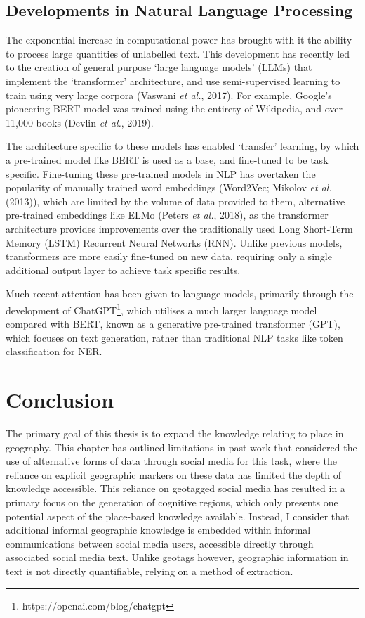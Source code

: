 \documentclass[
  letterpaper,
  11pt,
  english,
  onehalfspacing,
  headsepline]{MastersDoctoralThesis}
\begin{document}
\hypertarget{developments-in-natural-language-processing}{%
\subsection{Developments in Natural Language
Processing}\label{developments-in-natural-language-processing}}

The exponential increase in computational power has brought with it the
ability to process large quantities of unlabelled text. This development
has recently led to the creation of general purpose `large language
models' (LLMs) that implement the `transformer' architecture, and use
semi-supervised learning to train using very large corpora (Vaswani
\emph{et al.}, 2017). For example, Google's pioneering BERT model was
trained using the entirety of Wikipedia, and over 11,000 books (Devlin
\emph{et al.}, 2019).

The architecture specific to these models has enabled `transfer'
learning, by which a pre-trained model like BERT is used as a base, and
fine-tuned to be task specific. Fine-tuning these pre-trained models in
NLP has overtaken the popularity of manually trained word embeddings
(Word2Vec; Mikolov \emph{et al.} (2013)), which are limited by the
volume of data provided to them, alternative pre-trained embeddings like
ELMo (Peters \emph{et al.}, 2018), as the transformer architecture
provides improvements over the traditionally used Long Short-Term Memory
(LSTM) Recurrent Neural Networks (RNN). Unlike previous models,
transformers are more easily fine-tuned on new data, requiring only a
single additional output layer to achieve task specific results.

Much recent attention has been given to language models, primarily
through the development of ChatGPT\footnote{https://openai.com/blog/chatgpt},
which utilises a much larger language model compared with BERT, known as
a generative pre-trained transformer (GPT), which focuses on text
generation, rather than traditional NLP tasks like token classification
for NER.

\hypertarget{sec-litcon}{%
\section{Conclusion}\label{sec-litcon}}

The primary goal of this thesis is to expand the knowledge relating to
place in geography. This chapter has outlined limitations in past work
that considered the use of alternative forms of data through social
media for this task, where the reliance on explicit geographic markers
on these data has limited the depth of knowledge accessible. This
reliance on geotagged social media has resulted in a primary focus on
the generation of cognitive regions, which only presents one potential
aspect of the place-based knowledge available. Instead, I consider that
additional informal geographic knowledge is embedded within informal
communications between social media users, accessible directly through
associated social media text. Unlike geotags however, geographic
information in text is not directly quantifiable, relying on a method of
extraction.
\end{document}
